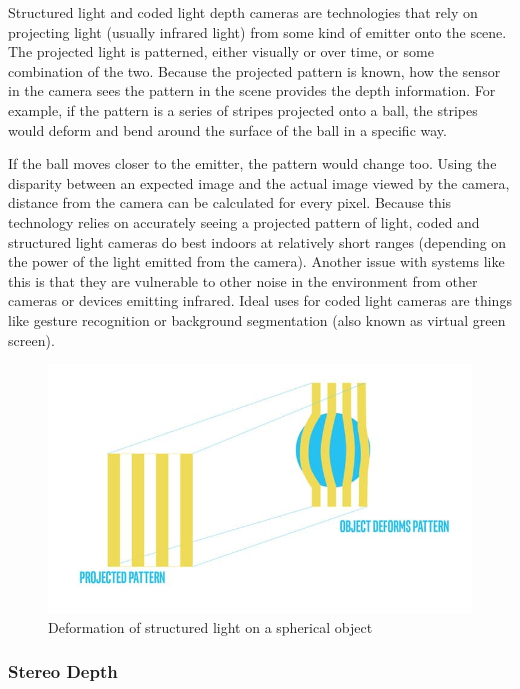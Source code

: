 \documentclass{article}
\begin{document}
Structured light and coded light depth cameras are technologies that rely on projecting light (usually infrared light) from some kind of emitter onto the scene. The projected light is patterned, either visually or over time, or some combination of the two. Because the projected pattern is known, how the sensor in the camera sees the pattern in the scene provides the depth information. For example, if the pattern is a series of stripes projected onto a ball, the stripes would deform and bend around the surface of the ball in a specific way.

If the ball moves closer to the emitter, the pattern would change too. Using the disparity between an expected image and the actual image viewed by the camera, distance from the camera can be calculated for every pixel. Because this technology relies on accurately seeing a projected pattern of light, coded and structured light cameras do best indoors at relatively short ranges (depending on the power of the light emitted from the camera). Another issue with systems like this is that they are vulnerable to other noise in the environment from other cameras or devices emitting infrared. Ideal uses for coded light cameras are things like gesture recognition or background segmentation (also known as virtual green screen).

\begin{figure}[h] %
	\centering
	\includegraphics[width=1\columnwidth]{report1-img001.png} %
	\caption{Deformation of structured light on a spherical object}
\end{figure}

\subsubsection{Stereo Depth}
\end{document}
